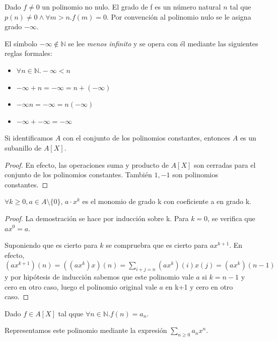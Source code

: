 \begin{definition}
Dado $f \neq 0$ un polinomio no nulo. El grado de f es un número natural $n$ tal que $p(n) \neq 0 \land \forall m > n. f(m) = 0$. Por convención al polinomio nulo se le asigna grado $-\infty$. 

El símbolo $-\infty \notin \mathbb{N}$ se lee \textit{ menos infinito } y se opera con él mediante las siguientes reglas formales:

\begin{itemize}
\item $\forall n \in \mathbb{N}.-\infty < n$
\item $-\infty + n = -\infty = n + (-\infty)$
\item $-\infty  n = -\infty = n (-\infty)$
\item $-\infty + -\infty = -\infty$
\end{itemize} 
\end{definition}

\begin{proposition}
	Si identificamos $A$ con el conjunto de los polinomios constantes, entonces $A$ es un subanillo de $A[X]$. 
\end{proposition}
\begin{proof}
	En efecto, las operaciones suma y producto de $A[X]$ son cerradas para el conjunto de los polinomios constantes. También $1,-1$ son polinomios constantes. 
\end{proof}

\begin{lemma}
	$\forall k \ge 0, a \in A \setminus \{0\}$, $a \cdot x^k$ es el monomio de grado k con coeficiente a en grado k. 
\end{lemma}
\begin{proof}
	La demostración se hace por inducción sobre k. Para $k = 0$, se verifica que $ax^0 = a$. 
	
	Suponiendo que es cierto para $k$ se compruebra que es cierto para $ax^{k+1}$. En efecto, $(ax^{k+1})(n) = ((ax^k)x)(n) = \sum_{i+j = n} (ax^k)(i)x(j) = (ax^k)(n-1)$ y por hipótesis de inducción sabemos que este polinomio vale $a$ si $k = n-1$ y cero en otro caso, luego el polinomio original vale $a$ en k+1 y cero en otro caso. 
\end{proof}

\begin{definition}
	Dado $f \in A[X]$ tal qque $\forall n \in \mathbb{N}. f(n) = a_n$. 
	
	Representamos este polinomio mediante la expresión $\sum_{n \ge 0} a_nx^n$. 
\end{definition}

